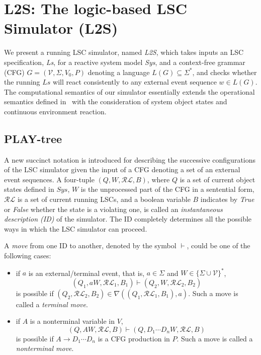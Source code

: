 \documentclass[]{llncs}
\begin{document}
\section{L2S: The logic-based LSC Simulator (L2S)}
\label{sec:l2s}

We present a running LSC simulator, named {\em L2S}, which takes inputs
an LSC specification, {\em Ls}, for a reactive system model {\em Sys},
and a context-free grammar (CFG)
$G = (\mathcal{V}, \Sigma, V_0, P)$
denoting a language $L(G) \subseteq \Sigma^{*}$,
and checks whether the running $Ls$ will react
consistently to any external event sequence $w \in L(G)$.
The computational semantics of our simulator essentially
extends the operational semantics defined in~\cite{HM03} with
the consideration of system object states and continuous
environment reaction.

\subsection{PLAY-tree}

A new succinct notation is introduced for describing the successive
configurations of the LSC simulator given the input of a CFG denoting
a set of an external event sequences.
A four-tuple $(Q, W, \mathcal{RL}, B)$,
where $Q$ is a set of current object states defined in $Sys$,
$W$ is the unprocessed part of the CFG in a sentential
form, $\mathcal{RL}$ is a set of current running LSCs,
and a boolean variable $B$ indicates by {\em True} or
{\em False} whether the state is a
violating one, is called an {\em instantaneous description (ID)}
of the simulator. The ID completely determines all the possible
ways in which the LSC simulator can proceed.

\begin{definition}[Move]
A {\em move} from one ID to another, denoted by the symbol $\vdash$,
could be one of the following cases:
\begin{itemize}
\item if $a$ is an external/terminal event, that is, $a \in \Sigma$ and $W \in \{\Sigma \cup \mathcal{V}\}^{*}$,
  \[
    (Q_1, aW, \mathcal{RL}_1, B_1) \vdash (Q_2, W, \mathcal{RL}_2, B_2)
  \]
  is possible if $(Q_2, \mathcal{RL}_2, B_2) \in \nabla((Q_1, \mathcal{RL}_1, B_1), a)$.
  Such a move is called a {\em terminal move}.
\item if $A$ is a nonterminal variable in $V$,
  \[
    (Q, AW, \mathcal{RL}, B) \vdash (Q, D_1\cdots D_nW, \mathcal{RL}, B)
  \]
  is possible if $A \rightarrow D_1\cdots D_n$ is
  a CFG production in $P$.
  Such a move is called a {\em nonterminal move}.
\end{itemize}
\end{definition}
\end{document}
